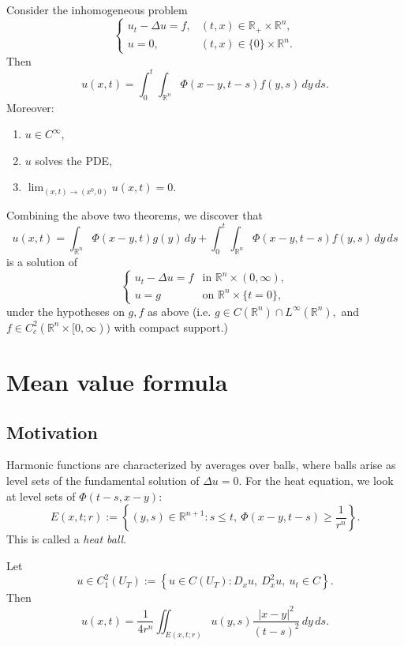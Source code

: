 \begin{theorem}
Consider the inhomogeneous problem
$$
\begin{cases}
u_t-\Delta u=f, & (t,x)\in \mathbb{R}_+\times \mathbb{R}^n,\\
u=0, & (t,x)\in \{0\}\times \mathbb{R}^n.
\end{cases}
$$
Then
$$
u(x,t)=\int_0^t\int_{\mathbb{R}^n}\Phi(x-y,t-s)f(y,s)\,dy\,ds.
$$
Moreover:
\begin{enumerate}
    \item $u\in C^\infty$,
    \item $u$ solves the PDE,
    \item
    $
    \lim_{(x,t)\to (x^0,0)}u(x,t)=0.
    $
\end{enumerate}
\end{theorem}

\begin{theorem}
Combining the above two theorems, we discover that
$$
u(x,t)
=
\int_{\mathbb{R}^n}\Phi(x-y,t)g(y)\,dy
+
\int_0^t\int_{\mathbb{R}^n}\Phi(x-y,t-s)f(y,s)\,dy\,ds
$$
is a solution of
$$
\begin{cases}
u_t-\Delta u=f & \text{in } \mathbb{R}^n\times (0,\infty),\\
u=g & \text{on } \mathbb{R}^n\times \{t=0\},
\end{cases}
$$
under the hypotheses on $g,f$ as above (i.e.
$
g\in C(\mathbb{R}^n)\cap L^\infty(\mathbb{R}^n), 
$
and 
$
f\in C_c^2(\mathbb{R}^n\times [0,\infty))
$
with compact support.)
\end{theorem}

\section{Mean value formula}

\subsection*{Motivation}
Harmonic functions are characterized by averages over balls, where balls arise as level sets of the fundamental solution of $\Delta u=0$.
For the heat equation, we look at level sets of $\Phi(t-s,x-y)$:
$$
E(x,t;r):=
\left\{
(y,s)\in \mathbb{R}^{n+1}: s\le t,\ \Phi(x-y,t-s)\ge \frac{1}{r^n}
\right\}.
$$
This is called a \emph{heat ball}.

\begin{theorem}
Let
$$
u\in C_1^2(U_T)
:=
\left\{
u\in C(U_T): D_xu,\ D_x^2u,\ u_t\in C
\right\}.
$$
Then
$$
u(x,t)
=
\frac{1}{4r^n}
\iint_{E(x,t;r)}
u(y,s)\frac{|x-y|^2}{(t-s)^2}\,dy\,ds.
$$
\end{theorem}

